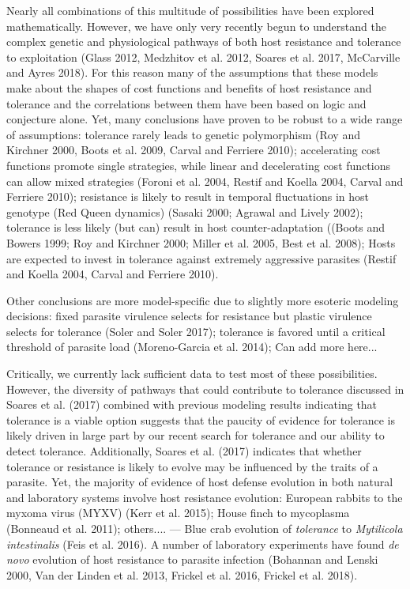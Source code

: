 Nearly all combinations of this multitude of possibilities have been explored mathematically. However, we have only very recently begun to understand the complex genetic and physiological pathways of both host resistance and tolerance to exploitation (Glass 2012, Medzhitov et al. 2012, Soares et al. 2017, McCarville and Ayres 2018). For this reason many of the assumptions that these models make about the shapes of cost functions and benefits of host resistance and tolerance and the correlations between them have been based on logic and conjecture alone. Yet, many conclusions have proven to be robust to a wide range of assumptions: tolerance rarely leads to genetic polymorphism (Roy and Kirchner 2000, Boots et al. 2009, Carval and Ferriere 2010); accelerating cost functions promote single strategies, while linear and decelerating cost functions can allow mixed strategies (Foroni et al. 2004, Restif and Koella 2004, Carval and Ferriere 2010); resistance is likely to result in temporal fluctuations in host genotype (Red Queen dynamics) (Sasaki 2000; Agrawal and Lively 2002); tolerance is less likely (but can) result in host counter-adaptation ((Boots and Bowers 1999; Roy and Kirchner 2000; Miller et al. 2005, Best et al. 2008); Hosts are expected to invest in tolerance against extremely aggressive parasites (Restif and Koella 2004, Carval and Ferriere 2010). 

Other conclusions are more model-specific due to slightly more esoteric modeling decisions: fixed parasite virulence selects for resistance but plastic virulence selects for tolerance (Soler and Soler 2017); tolerance is favored until a critical threshold of parasite load (Moreno-Garcia et al. 2014); Can add more here...

Critically, we currently lack sufficient data to test most of these possibilities. However, the diversity of pathways that could contribute to tolerance discussed in Soares et al. (2017) combined with previous modeling results indicating that tolerance is a viable option suggests that the paucity of evidence for tolerance is likely driven in large part by our recent search for tolerance and our ability to detect tolerance. Additionally, Soares et al. (2017) indicates that whether tolerance or resistance is likely to evolve may be influenced by the traits of a parasite. Yet, the majority of evidence of host defense evolution in both natural and laboratory systems involve host resistance evolution: European rabbits to the myxoma virus (MYXV) (Kerr et al. 2015); House finch to mycoplasma (Bonneaud et al. 2011); others.... --- Blue crab evolution of \emph{tolerance} to \emph{Mytilicola intestinalis} (Feis et al. 2016). A number of laboratory experiments have found \emph{de novo} evolution of host resistance to parasite infection (Bohannan and Lenski 2000, Van der Linden et al. 2013, Frickel et al. 2016, Frickel et al. 2018).

